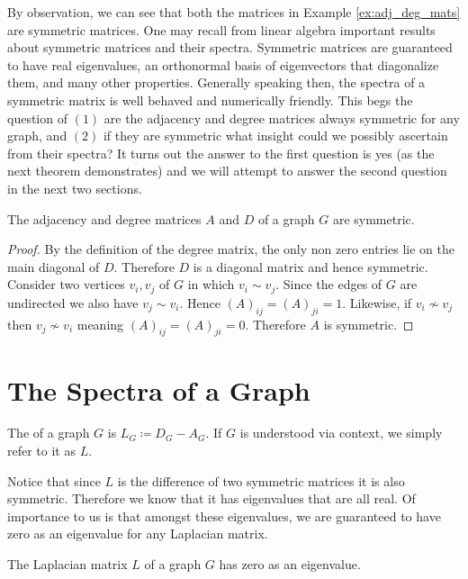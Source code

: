 \documentclass[11pt]{article}
\begin{document}
By observation, we can see that both the matrices in Example \ref{ex:adj_deg_mats} are symmetric matrices. One may recall from linear algebra important results about symmetric matrices and their spectra. Symmetric matrices are guaranteed to have real eigenvalues, an orthonormal basis of eigenvectors that diagonalize them, and many other properties. Generally speaking then, the spectra of a symmetric matrix is well behaved and numerically friendly. This begs the question of $(1)$ are the adjacency and degree matrices always symmetric for any graph, and $(2)$ if they are symmetric what insight could we possibly ascertain from their spectra? It turns out the answer to the first question is yes (as the next theorem demonstrates) and we will attempt to answer the second question in the next two sections.

\begin{theorem}
    \label{thm:adj_deg_symmetric}
    The adjacency and degree matrices $A$ and $D$ of a graph $G$ are symmetric.
\end{theorem}

\begin{proof}
    By the definition of the degree matrix, the only non zero entries lie on the main diagonal of $D$. Therefore $D$ is a diagonal matrix and hence symmetric. Consider two vertices $v_i, v_j$ of $G$ in which $v_i \sim v_j$. Since the edges of $G$ are undirected we also have $v_j \sim v_i$. Hence $(A)_{ij} = (A)_{ji} = 1$. Likewise, if $v_i \not\sim v_j$ then $v_j \not\sim v_i$ meaning $(A)_{ij} = (A)_{ji} = 0$. Therefore $A$ is symmetric.
\end{proof}

\section{The Spectra of a Graph}

\begin{definition}
    The  of a graph $G$ is $L_G \coloneq D_G - A_G$. If $G$ is understood via context, we simply refer to it as $L$.
\end{definition}

Notice that since $L$ is the difference of two symmetric matrices it is also symmetric. Therefore we know that it has eigenvalues that are all real. Of importance to us is that amongst these eigenvalues, we are guaranteed to have zero as an eigenvalue for any Laplacian matrix.

\begin{theorem}
    \label{thm:lap_zero_eig_always}
    The Laplacian matrix $L$ of a graph $G$ has zero as an eigenvalue.
\end{theorem}
\end{document}
